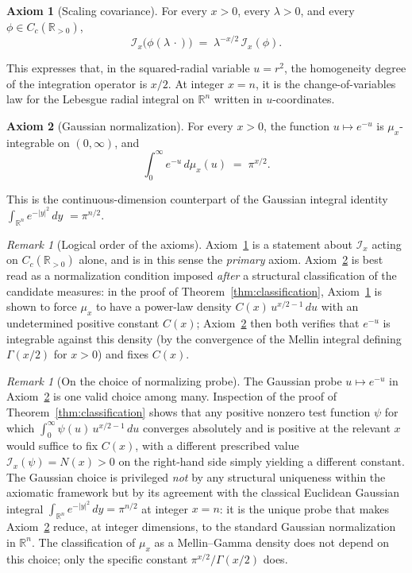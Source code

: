 \documentclass[11pt,a4paper]{article}
\theoremstyle{plain}
\theoremstyle{definition}
\newtheorem{axiom}{Axiom}
\theoremstyle{remark}
\newtheorem{remark}[theorem]{Remark}
\newcommand{\R}{\mathbb{R}}
\newcommand{\Cc}{C_c}
\newcommand{\Iop}{\mathcal{I}}
\begin{document}
\begin{axiom}[Scaling covariance]\label{ax:scaling}
For every $x>0$, every $\lambda>0$, and every $\phi\in\Cc(\R_{>0})$,
\[
\Iop_x\bigl(\phi(\lambda\,\cdot)\bigr) \;=\; \lambda^{-x/2}\,\Iop_x(\phi).
\]
\end{axiom}

This expresses that, in the squared-radial variable $u=r^2$, the homogeneity degree of the integration operator is $x/2$. At integer $x=n$, it is the change-of-variables law for the Lebesgue radial integral on $\R^n$ written in $u$-coordinates.

\begin{axiom}[Gaussian normalization]\label{ax:gauss}
For every $x>0$, the function $u\mapsto e^{-u}$ is $\mu_x$-integrable on $(0,\infty)$, and
\[
\int_0^\infty e^{-u}\,d\mu_x(u) \;=\; \pi^{x/2}.
\]
\end{axiom}

This is the continuous-dimension counterpart of the Gaussian integral identity $\int_{\R^n} e^{-|y|^2}\,dy$ ${} = \pi^{n/2}$.

\begin{remark}[Logical order of the axioms]\label{rmk:order}
Axiom~\ref{ax:scaling} is a statement about $\Iop_x$ acting on $\Cc(\R_{>0})$ alone, and is in this sense the \emph{primary} axiom. Axiom~\ref{ax:gauss} is best read as a normalization condition imposed \emph{after} a structural classification of the candidate measures: in the proof of Theorem~\ref{thm:classification}, Axiom~\ref{ax:scaling} is shown to force $\mu_x$ to have a power-law density $C(x)\,u^{x/2-1}\,du$ with an undetermined positive constant $C(x)$; Axiom~\ref{ax:gauss} then both verifies that $e^{-u}$ is integrable against this density (by the convergence of the Mellin integral defining $\Gamma(x/2)$ for $x>0$) and fixes $C(x)$.
\end{remark}

\begin{remark}[On the choice of normalizing probe]\label{rmk:probe-choice}
The Gaussian probe $u\mapsto e^{-u}$ in Axiom~\ref{ax:gauss} is one valid choice among many. Inspection of the proof of Theorem~\ref{thm:classification} shows that any positive nonzero test function $\psi$ for which $\int_0^\infty \psi(u)\,u^{x/2-1}\,du$ converges absolutely and is positive at the relevant $x$ would suffice to fix $C(x)$, with a different prescribed value $\Iop_x(\psi) = N(x) > 0$ on the right-hand side simply yielding a different constant. The Gaussian choice is privileged \emph{not} by any structural uniqueness within the axiomatic framework but by its agreement with the classical Euclidean Gaussian integral $\int_{\R^n} e^{-|y|^2}\,dy = \pi^{n/2}$ at integer $x=n$: it is the unique probe that makes Axiom~\ref{ax:gauss} reduce, at integer dimensions, to the standard Gaussian normalization in $\R^n$. The classification of $\mu_x$ as a Mellin--Gamma density does not depend on this choice; only the specific constant $\pi^{x/2}/\Gamma(x/2)$ does.
\end{remark}
\end{document}
